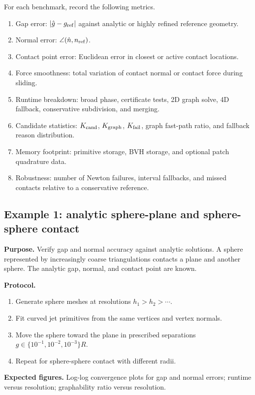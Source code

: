 \documentclass[preprint,12pt]{elsarticle}
\begin{document}
For each benchmark, record the following metrics.
\begin{enumerate}[leftmargin=*]
    \item Gap error: $|\hat g-g_{\rm ref}|$ against analytic or highly refined reference geometry.
    \item Normal error: $\angle(\hat n,n_{\rm ref})$.
    \item Contact point error: Euclidean error in closest or active contact locations.
    \item Force smoothness: total variation of contact normal or contact force during sliding.
    \item Runtime breakdown: broad phase, certificate tests, 2D graph solve, 4D fallback, conservative subdivision, and merging.
    \item Candidate statistics: $K_{\rm cand}$, $K_{\rm graph}$, $K_{\rm fail}$, graph fast-path ratio, and fallback reason distribution.
    \item Memory footprint: primitive storage, BVH storage, and optional patch quadrature data.
    \item Robustness: number of Newton failures, interval fallbacks, and missed contacts relative to a conservative reference.
\end{enumerate}

\subsection{Example 1: analytic sphere-plane and sphere-sphere contact}

\textbf{Purpose.} Verify gap and normal accuracy against analytic solutions. A sphere represented by increasingly coarse triangulations contacts a plane and another sphere. The analytic gap, normal, and contact point are known.

\textbf{Protocol.}
\begin{enumerate}[leftmargin=*]
    \item Generate sphere meshes at resolutions $h_1>h_2>\cdots$.
    \item Fit curved jet primitives from the same vertices and vertex normals.
    \item Move the sphere toward the plane in prescribed separations $g\in\{10^{-1},10^{-2},10^{-3}\}R$.
    \item Repeat for sphere-sphere contact with different radii.
\end{enumerate}

\textbf{Expected figures.} Log-log convergence plots for gap and normal errors; runtime versus resolution; graphability ratio versus resolution.
\end{document}
